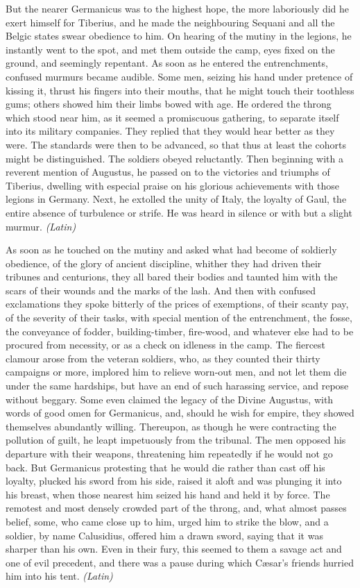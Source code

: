 
But the nearer Germanicus was to the highest hope, the more laboriously did he exert himself for Tiberius, and he made the neighbouring Sequani and all the Belgic states swear obedience to him. On hearing of the mutiny in the legions, he instantly went to the spot, and met them outside the camp, eyes fixed on the ground, and seemingly repentant. As soon as he entered the entrenchments, confused murmurs became audible. Some men, seizing his hand under pretence of kissing it, thrust his fingers into their mouths, that he might touch their toothless gums; others showed him their limbs bowed with age. He ordered the throng which stood near him, as it seemed a promiscuous gathering, to separate itself into its military companies. They replied that they would hear better as they were. The standards were then to be advanced, so that thus at least the cohorts might be distinguished. The soldiers obeyed reluctantly. Then beginning with a reverent mention of Augustus, he passed on to the victories and triumphs of Tiberius, dwelling with especial praise on his glorious achievements with those legions in Germany. Next, he extolled the unity of Italy, the loyalty of Gaul, the entire absence of turbulence or strife. He was heard in silence or with but a slight murmur. \emph{(Latin)}


As soon as he touched on the mutiny and asked what had become of soldierly obedience, of the glory of ancient discipline, whither they had driven their tribunes and centurions, they all bared their bodies and taunted him with the scars of their wounds and the marks of the lash. And then with confused exclamations they spoke bitterly of the prices of exemptions, of their scanty pay, of the severity of their tasks, with special mention of the entrenchment, the fosse, the conveyance of fodder, building-timber, fire-wood, and whatever else had to be procured from necessity, or as a check on idleness in the camp. The fiercest clamour arose from the veteran soldiers, who, as they counted their thirty campaigns or more, implored him to relieve worn-out men, and not let them die under the same hardships, but have an end of such harassing service, and repose without beggary. Some even claimed the legacy of the Divine Augustus, with words of good omen for Germanicus, and, should he wish for empire, they showed themselves abundantly willing. Thereupon, as though he were contracting the pollution of guilt, he leapt impetuously from the tribunal. The men opposed his departure with their weapons, threatening him repeatedly if he would not go back. But Germanicus protesting that he would die rather than cast off his loyalty, plucked his sword from his side, raised it aloft and was plunging it into his breast, when those nearest him seized his hand and held it by force. The remotest and most densely crowded part of the throng, and, what almost passes belief, some, who came close up to him, urged him to strike the blow, and a soldier, by name Calusidius, offered him a drawn sword, saying that it was sharper than his own. Even in their fury, this seemed to them a savage act and one of evil precedent, and there was a pause during which Cæsar's friends hurried him into his tent. \emph{(Latin)}

